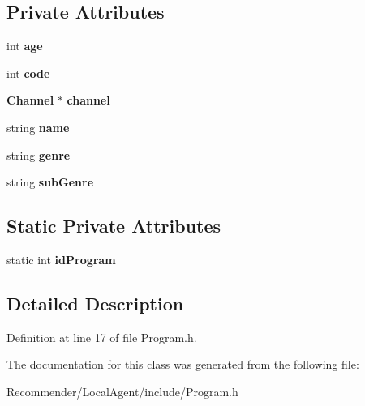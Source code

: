 \subsection*{Private Attributes}
\begin{CompactItemize}
\item 
int {\bf age}\label{classbr_1_1ufscar_1_1lince_1_1ginga_1_1recommender_1_1Program_91d98a856bbd96810b40af3ca5cc901a}

\item 
int {\bf code}\label{classbr_1_1ufscar_1_1lince_1_1ginga_1_1recommender_1_1Program_45a5b7c00a796a23f01673cef1dbe0a9}

\item 
{\bf Channel} $\ast$ {\bf channel}\label{classbr_1_1ufscar_1_1lince_1_1ginga_1_1recommender_1_1Program_2825c81f42f83639e55dc95bcfd53d9e}

\item 
string {\bf name}\label{classbr_1_1ufscar_1_1lince_1_1ginga_1_1recommender_1_1Program_8ccf841cb59e451791bcb2e1ac4f1edc}

\item 
string {\bf genre}\label{classbr_1_1ufscar_1_1lince_1_1ginga_1_1recommender_1_1Program_779540a092c0987ae4ad7076eec46f69}

\item 
string {\bf subGenre}\label{classbr_1_1ufscar_1_1lince_1_1ginga_1_1recommender_1_1Program_7df0b674d23a395f11281e539a7da49d}

\end{CompactItemize}
\subsection*{Static Private Attributes}
\begin{CompactItemize}
\item 
static int {\bf idProgram}\label{classbr_1_1ufscar_1_1lince_1_1ginga_1_1recommender_1_1Program_b65599d8513995fa677039f823b80f5f}

\end{CompactItemize}


\subsection{Detailed Description}




Definition at line 17 of file Program.h.

The documentation for this class was generated from the following file:\begin{CompactItemize}
\item 
Recommender/LocalAgent/include/Program.h\end{CompactItemize}
